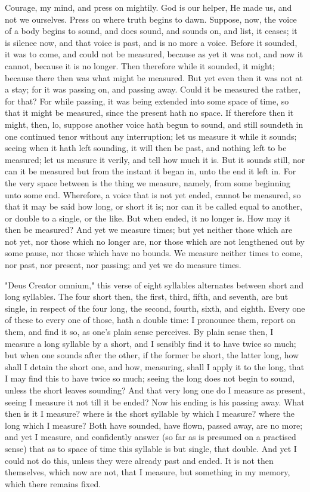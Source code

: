 \documentclass[b5paper,openright,12pt,twoside]{book}
\begin{document}
Courage, my mind, and press on mightily. God is our helper, He made us,
and not we ourselves. Press on where truth begins to dawn. Suppose, now,
the voice of a body begins to sound, and does sound, and sounds on, and
list, it ceases; it is silence now, and that voice is past, and is
no more a voice. Before it sounded, it was to come, and could not be
measured, because as yet it was not, and now it cannot, because it is
no longer. Then therefore while it sounded, it might; because there then
was what might be measured. But yet even then it was not at a stay; for
it was passing on, and passing away. Could it be measured the rather,
for that? For while passing, it was being extended into some space of
time, so that it might be measured, since the present hath no space. If
therefore then it might, then, lo, suppose another voice hath begun
to sound, and still soundeth in one continued tenor without any
interruption; let us measure it while it sounds; seeing when it hath
left sounding, it will then be past, and nothing left to be measured;
let us measure it verily, and tell how much it is. But it sounds still,
nor can it be measured but from the instant it began in, unto the end
it left in. For the very space between is the thing we measure, namely,
from some beginning unto some end. Wherefore, a voice that is not yet
ended, cannot be measured, so that it may be said how long, or short it
is; nor can it be called equal to another, or double to a single, or the
like. But when ended, it no longer is. How may it then be measured? And
yet we measure times; but yet neither those which are not yet, nor those
which no longer are, nor those which are not lengthened out by some
pause, nor those which have no bounds. We measure neither times to come,
nor past, nor present, nor passing; and yet we do measure times.

"Deus Creator omnium," this verse of eight syllables alternates between
short and long syllables. The four short then, the first, third, fifth,
and seventh, are but single, in respect of the four long, the second,
fourth, sixth, and eighth. Every one of these to every one of those,
hath a double time: I pronounce them, report on them, and find it so,
as one's plain sense perceives. By plain sense then, I measure a long
syllable by a short, and I sensibly find it to have twice so much; but
when one sounds after the other, if the former be short, the latter
long, how shall I detain the short one, and how, measuring, shall I
apply it to the long, that I may find this to have twice so much; seeing
the long does not begin to sound, unless the short leaves sounding? And
that very long one do I measure as present, seeing I measure it not
till it be ended? Now his ending is his passing away. What then is it I
measure? where is the short syllable by which I measure? where the long
which I measure? Both have sounded, have flown, passed away, are no
more; and yet I measure, and confidently answer (so far as is presumed
on a practised sense) that as to space of time this syllable is but
single, that double. And yet I could not do this, unless they were
already past and ended. It is not then themselves, which now are not,
that I measure, but something in my memory, which there remains fixed.
\end{document}
